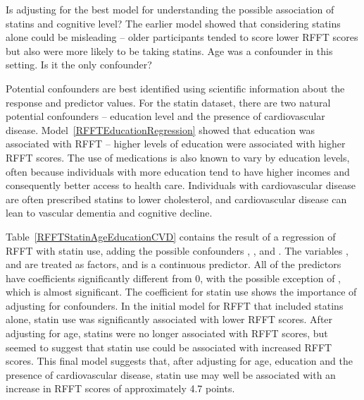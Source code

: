 Is adjusting for  the best model for understanding the possible association of statins and cognitive level?  The earlier model showed that considering statins alone could be misleading -- older participants tended to score lower RFFT scores but also were more likely to be taking statins.  Age was a confounder in this setting.  Is it the only confounder?

Potential confounders are best identified using scientific information about the response and predictor values.  For the statin dataset, there are two natural potential confounders -- education level and the presence of cardiovascular disease. Model~\ref{RFFTEducationRegression} showed that education was associated with RFFT -- higher levels of education were associated with higher RFFT scores.  The use of medications is also known to vary by education levels, often because individuals with more education tend to have higher incomes and consequently better access to health care.  Individuals with cardiovascular disease are often prescribed statins to lower cholesterol, and cardiovascular disease can lean to vascular dementia and cognitive decline.  

Table~\ref{RFFTStatinAgeEducationCVD} contains the result of a regression of RFFT with statin use, adding the possible confounders , , and . The variables ,  and  are treated as factors, and  is a continuous predictor.  All of the predictors have coefficients significantly different from 0, with the possible exception of , which is almost significant.  The coefficient for statin use shows the importance of adjusting for confounders.  In the initial model for RFFT that included statins alone, statin use was significantly associated with lower RFFT scores.  After adjusting for age, statins were no longer associated with RFFT scores, but seemed to suggest that statin use could be associated with increased RFFT scores.  This final model suggests that, after adjusting for age, education and the presence of cardiovascular disease, statin use may well be associated with an increase in RFFT scores of approximately 4.7 points.

